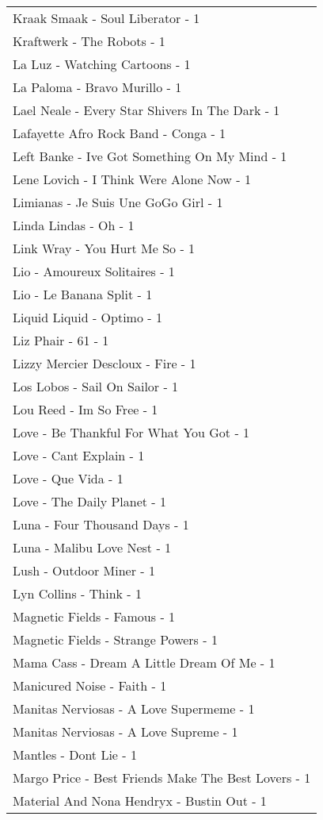 \documentclass[
]{article}
\begin{document}
\begin{longtable}{l}
Kraak Smaak - Soul Liberator - 1 \\ 
Kraftwerk - The Robots - 1 \\ 
La Luz - Watching Cartoons - 1 \\ 
La Paloma - Bravo Murillo - 1 \\ 
Lael Neale - Every Star Shivers In The Dark - 1 \\ 
Lafayette Afro Rock Band - Conga - 1 \\ 
Left Banke - Ive Got Something On My Mind - 1 \\ 
Lene Lovich - I Think Were Alone Now - 1 \\ 
Limianas - Je Suis Une GoGo Girl - 1 \\ 
Linda Lindas - Oh - 1 \\ 
Link Wray - You Hurt Me So - 1 \\ 
Lio - Amoureux Solitaires - 1 \\ 
Lio - Le Banana Split - 1 \\ 
Liquid Liquid - Optimo - 1 \\ 
Liz Phair - 61 - 1 \\ 
Lizzy Mercier Descloux - Fire - 1 \\ 
Los Lobos - Sail On Sailor - 1 \\ 
Lou Reed - Im So Free - 1 \\ 
Love - Be Thankful For What You Got - 1 \\ 
Love - Cant Explain - 1 \\ 
Love - Que Vida - 1 \\ 
Love - The Daily Planet - 1 \\ 
Luna - Four Thousand Days - 1 \\ 
Luna - Malibu Love Nest - 1 \\ 
Lush - Outdoor Miner - 1 \\ 
Lyn Collins - Think - 1 \\ 
Magnetic Fields - Famous - 1 \\ 
Magnetic Fields - Strange Powers - 1 \\ 
Mama Cass - Dream A Little Dream Of Me - 1 \\ 
Manicured Noise - Faith - 1 \\ 
Manitas Nerviosas - A Love Supermeme - 1 \\ 
Manitas Nerviosas - A Love Supreme - 1 \\ 
Mantles - Dont Lie - 1 \\ 
Margo Price - Best Friends Make The Best Lovers - 1 \\ 
Material And Nona Hendryx - Bustin Out - 1 \\ 

\end{longtable}
\end{document}

